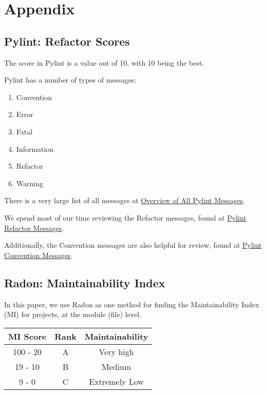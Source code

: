 \setcounter{chapter}{7}

\chapter*{Appendix} \label{chapterAppendix}

\section{Pylint: Refactor Scores} \label{appendixPylintRefactor}

The score in Pylint is a value out of 10, with 10 being the best.

Pylint has a number of types of messages:
\begin{singlespace}
  \begin{enumerate}
    \item Convention
    \item Error
    \item Fatal
    \item Information
    \item Refactor
    \item Warning
  \end{enumerate}
\end{singlespace}

There is a very large list of all messages at \href{https://pylint.pycqa.org/en/latest/messages/messages_list.html}{Overview of All Pylint Messages}.

We spend most of our time reviewing the Refactor messages, found at \href{https://pylint.pycqa.org/en/latest/messages/messages_list.html#refactor}{Pylint Refactor Messages}.

Additionally, the Convention messages are also helpful for review, found at \href{https://pylint.pycqa.org/en/latest/messages/messages_list.html#convention}{Pylint Convention Messages}.

\section{Radon: Maintainability Index} \label{appendixRadonRefactor}

In this paper, we use Radon as one method for finding the Maintainability Index (MI) for projects, at the module (file) level.

\begin{center}
  \begin{tabular}{ c c c }
    MI Score & Rank & Maintainability \\ \hline\hline
    100 - 20 & A & Very high \\ \hline
    19 - 10 & B & Medium \\ \hline
    9 - 0 & C & Extremely Low \\ \hline    
  \end{tabular}
\end{center}
